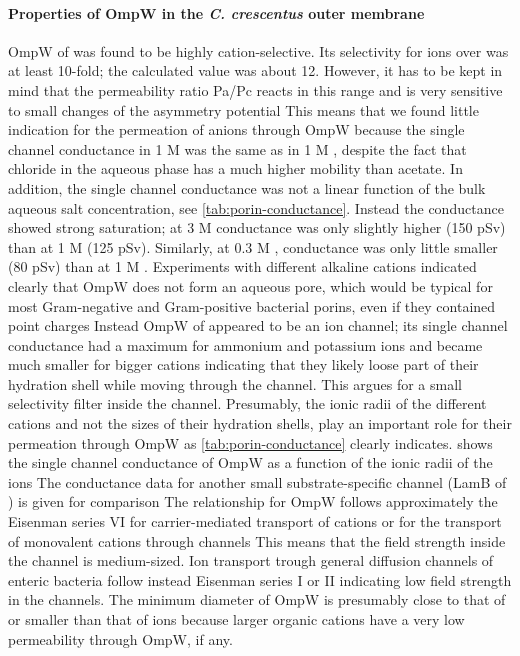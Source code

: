 \paragraph{Properties of OmpW in the \textit{C. crescentus} outer membrane}
OmpW of \caulobacter was found to be highly cation-selective. Its selectivity for  ions over  was at least 10-fold; the calculated value was about 12. However, it has to be kept in mind that the permeability ratio Pa/Pc reacts in this range and is very sensitive to small changes of the asymmetry potential This means that we found little indication for the permeation of anions through OmpW because the single channel conductance in 1 M  was the same as in 1 M , despite the fact that chloride in the aqueous phase has a much higher mobility than acetate. In addition, the single channel conductance was not a linear function of the bulk aqueous salt concentration, see \cref{tab:porin-conductance}. Instead the conductance showed strong saturation; at 3 M  conductance was only slightly higher (150 \si{\pico\sievert}) than at 1 M  (125 \si{\pico\sievert}). Similarly, at 0.3 M , conductance was only little smaller (80 \si{\pico\sievert}) than at 1 M . Experiments with different alkaline cations indicated clearly that OmpW does not form an aqueous pore, which would be typical for most Gram-negative and Gram-positive bacterial porins, even if they contained point charges Instead OmpW of \caulobacter appeared to be an ion channel; its single channel conductance had a maximum for ammonium and potassium ions and became much smaller for bigger cations indicating that they likely loose part of their hydration shell while moving through the channel. This argues for a small selectivity filter inside the channel. Presumably, the ionic radii of the different cations and not the sizes of their hydration shells, play an important role for their permeation through OmpW as \cref{tab:porin-conductance} clearly indicates.  shows the single channel conductance of OmpW as a function of the ionic radii of the ions The conductance data for another small substrate-specific channel (LamB of \ecoli) is given for comparison The relationship for OmpW follows approximately the Eisenman series VI for carrier-mediated transport of cations or for the transport of monovalent cations through channels This means that the field strength inside the channel is medium-sized. Ion transport trough general diffusion channels of enteric bacteria follow instead Eisenman series I or II indicating low field strength in the channels. The minimum diameter of OmpW is presumably close to that of  or smaller than that of  ions because larger organic cations have a very low permeability through OmpW, if any. 

